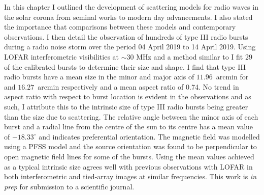 In this chapter I outlined the development of scattering models for radio waves in the solar corona from seminal works to modern day advancements. I also stated the importance that comparisons between these models and contemporary observations. I then detail the observation of hundreds of type III radio bursts during a radio noise storm over the period 04 April 2019 to 14 April 2019. Using LOFAR interferometric visibilities at $\sim 30$ MHz and a method similar to \cite{Murphy2021} I fit 29 of the calibrated bursts to determine their size and shape. I find that type III radio bursts have a mean size in the minor and major axis of $11.96$~arcmin for and $16.27$~arcmin respectively and a mean aspect ratio of 0.74. No trend in aspect ratio with respect to burst location is evident in the observations and as such, I attribute this to the intrinsic size of type III radio bursts being greater than the size due to scattering. The relative angle between the minor axis of each burst and a radial line from the centre of the sun to its centre has a mean value of $-18.33^\circ$ and indicates preferential orientation. The magnetic field was modelled using a PFSS model and the source orientation was found to be perpendicular to open magnetic field lines for some of the bursts. Using the mean values achieved as a typical intrinsic size agrees well with previous observations with LOFAR in both interferometric and tied-array images at similar frequencies. This work is \textit{in prep} for submission to a scientific journal.
